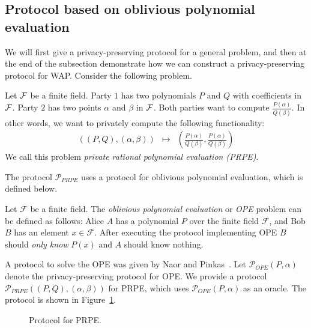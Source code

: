 \subsection{Protocol based on oblivious polynomial evaluation}
\label{subsec:OPE}

We will first give a privacy-preserving protocol for a general problem,
and then at the end of the subsection demonstrate how we can construct
a privacy-preserving protocol for WAP.  Consider the following
problem.

\begin{definition}
\rm
Let ${\cal F}$ be a finite field. Party $1$ has two polynomials $P$
and $Q$ with coefficients in ${\cal F}$. Party $2$ has two points
$\alpha$ and $\beta$ in ${\cal F}$. Both parties want to compute
$\frac{P(\alpha)}{Q(\beta)}$. In other words, we want to privately
compute the following functionality:
\begin{eqnarray*}
((P,Q),(\alpha,\beta)) & \longmapsto & (\frac{P(\alpha)}{Q(\beta)},\frac{P(\alpha)}{Q(\beta)})
\end{eqnarray*}
We call this problem {\em private rational polynomial evaluation (PRPE)}.
\end{definition}

The protocol $\mathcal{P}_{PRPE}$
uses a protocol for oblivious polynomial evaluation, which is defined below.

\begin{definition}
\rm
Let $\mathcal{F}$ be a finite field.  The {\em oblivious polynomial
evaluation} or {\em OPE} problem can be defined as follows: Alice
$A$ has a polynomial $P$ over the finite field $\mathcal{F}$, and
Bob $B$ has an element $x \in \mathcal{F}$. After executing the  protocol
implementing OPE $B$ should {\em only know} $P(x)$ and $A$ should
know nothing.
\end{definition}

A protocol to solve the OPE was  given by Naor and
Pinkas~\cite{NaorPinkas99}.  Let $\mathcal{P}_{OPE}(P,\alpha)$ denote
the privacy-preserving protocol for OPE. We provide a protocol
$\mathcal{P}_{PRPE}((P,Q),(\alpha,\beta))$ for PRPE, which uses
$\mathcal{P}_{OPE}(P,\alpha)$ as an oracle. The protocol is shown in
Figure~\ref{fig:PRPE}. 

\begin{figure}
\caption{Protocol for PRPE.}
\label{fig:PRPE}
\end{figure}


